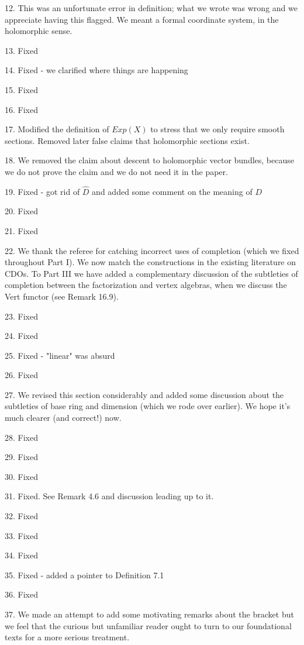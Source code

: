 \documentclass[10pt]{amsart}
\begin{document}
12. This was an unfortunate error in definition; what we wrote was wrong and we appreciate having this flagged. We meant a formal coordinate system, in the holomorphic sense. 

13. Fixed

14. Fixed - we clarified where things are happening 

15. Fixed

16. Fixed

17. Modified the definition of $Exp(X)$ to stress that we only require smooth sections. 
Removed later false claims that holomorphic sections exist.

18. We removed the claim about descent to holomorphic vector bundles, because we do not prove the claim and we do not need it in the paper.

19. Fixed - got rid of $\hat{D}$ and added some comment on the meaning of $D$

20. Fixed

21. Fixed

22. We thank the referee for catching incorrect uses of completion (which we fixed throughout Part I). We now match the constructions in the existing literature on CDOs. To Part III we have added a complementary discussion of the subtleties of completion between the factorization and vertex algebras, when we discuss the Vert functor (see Remark 16.9).

23. Fixed

24. Fixed

25. Fixed - "linear" was absurd

26. Fixed

27. We revised this section considerably and added some discussion about the subtleties of base ring and dimension (which we rode over earlier). We hope it's much clearer (and correct!) now.

28. Fixed

29. Fixed

30. Fixed

31. Fixed. See Remark 4.6 and discussion leading up to it.

32. Fixed

33. Fixed

34. Fixed

35. Fixed - added a pointer to Definition 7.1

36. Fixed

37. We made an attempt to add some motivating remarks about the bracket but we feel that the curious but unfamiliar reader ought to turn to our foundational texts for a more serious treatment.
\end{document}
